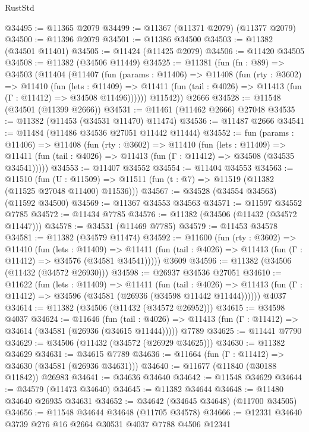 \begin{lexlean}{RustStd}
\begin{coremodule}
@34495 := @11365 @2079
@34499 := @11367 (@11371 @2079) (@11377 @2079)
@34500 := @11396 @2079
@34501 := @11386 @34500
@34503 := @11382 (@34501 @11401)
@34505 := @11424 (@11425 @2079)
@34506 := @11420 @34505
@34508 := @11382 (@34506 @11449)
@34525 := @11381
    (fun (fn : @89) =>
    @34503
      (@11404
        (@11407
          (fun (params : @11406) =>
          @11408
            (fun (rty : @3602) =>
            @11410
              (fun (lets : @11409) =>
              @11411 (fun (tail : @4026) => @11413 (fun (Γ : @11412) => @34508 @11496))))))
        @11542))
    @2666
@34528 := @11548 (@34501 (@11399 @2666))
@34531 := @11461 (@11462 @2666) @27048
@34535 := @11382 (@11453 (@34531 @11470) @11474)
@34536 := @11487 @2666
@34541 := @11484 (@11486 @34536 @27051 @11442 @11444)
@34552 := fun (params : @11406) =>
  @11408
    (fun (rty : @3602) =>
    @11410
      (fun (lets : @11409) =>
      @11411 (fun (tail : @4026) => @11413 (fun (Γ : @11412) => @34508 (@34535 @34541)))))
@34553 := @11407 @34552
@34554 := @11404 @34553
@34563 := @11510
    (fun (U : @11509) => @11511 (fun (t : @7) => @11519 (@11382 (@11525 @27048 @11400) @11536)))
@34567 := @34528 (@34554 @34563) (@11592 @34500)
@34569 := @11367 @34553 @34563
@34571 := @11597 @34552 @7785
@34572 := @11434 @7785
@34576 := @11382 (@34506 (@11432 (@34572 @11447)))
@34578 := @34531 (@11469 @7785)
@34579 := @11453 @34578
@34581 := @11382 (@34579 @11474)
@34592 := @11600
    (fun (rty : @3602) =>
    @11410
      (fun (lets : @11409) =>
      @11411 (fun (tail : @4026) => @11413 (fun (Γ : @11412) => @34576 (@34581 @34541)))))
    @3609
@34596 := @11382 (@34506 (@11432 (@34572 @26930)))
@34598 := @26937 @34536 @27051
@34610 := @11622
    (fun (lets : @11409) =>
    @11411
      (fun (tail : @4026) =>
      @11413 (fun (Γ : @11412) => @34596 (@34581 (@26936 (@34598 @11442 @11444))))))
    @4037
@34614 := @11382 (@34506 (@11432 (@34572 @26952)))
@34615 := @34598 @4037
@34624 := @11646
    (fun (tail : @4026) => @11413 (fun (Γ : @11412) => @34614 (@34581 (@26936 (@34615 @11444)))))
    @7789
@34625 := @11441 @7790
@34629 := @34506 (@11432 (@34572 (@26929 @34625)))
@34630 := @11382 @34629
@34631 := @34615 @7789
@34636 := @11664 (fun (Γ : @11412) => @34630 (@34581 (@26936 @34631)))
@34640 := @11677 (@11840 (@30188 @11842)) @26983
@34641 := @34636 @34640
@34642 := @11548 @34629
@34644 := @34579 (@11473 @34640)
@34645 := @11382 @34644
@34648 := @11480 @34640 @26935 @34631
@34652 := @34642 (@34645 @34648) (@11700 @34505)
@34656 := @11548 @34644 @34648 (@11705 @34578)
@34666 := @12331 @34640 @3739 @276 @16 @2664 @30531 @4037 @7788 @4506 @12341

\end{coremodule}
\end{lexlean}
